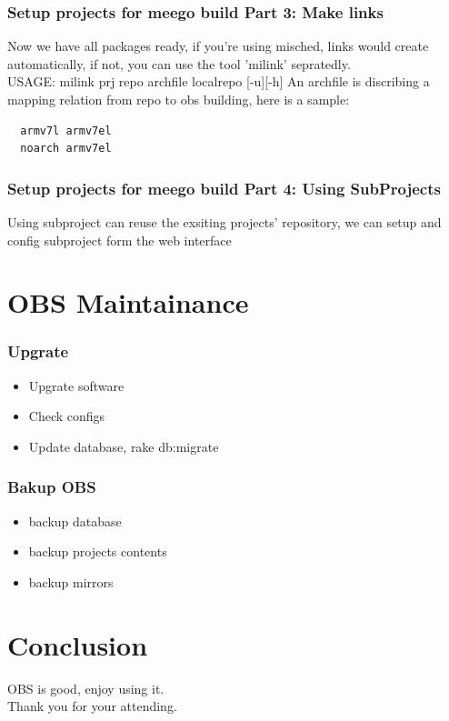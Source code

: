 \documentclass{beamer}
\begin{document}
\begin{frame}[fragile]
  \frametitle{Setup projects for meego build Part 3: Make links}
  Now we have all packages ready, if you're using misched, links would create automatically, if not, you can use the tool 'milink' sepratedly. \\
  USAGE: milink prj repo archfile localrepo [-u][-h]
  An archfile is discribing a mapping relation from repo to obs building, here is a sample: \\

  \lstset{language=perl}
  \begin{lstlisting}
  armv7l armv7el
  noarch armv7el
  \end{lstlisting}
\end{frame}

\begin{frame}
  \frametitle{Setup projects for meego build Part 4: Using SubProjects}
  Using subproject can reuse the exsiting projects' repository, we can setup and config subproject form the web interface\\
\end{frame}

\section{OBS Maintainance}

\begin{frame}
  \frametitle{Upgrate}
  \begin{itemize}
    \item Upgrate software
    \item Check configs
    \item Update database, rake db:migrate
  \end{itemize}
  
\end{frame}
\begin{frame}
  \frametitle{Bakup OBS}
  \begin{itemize}
    \item backup database
    \item backup projects contents
    \item backup mirrors
  \end{itemize}
\end{frame}

\section{Conclusion}
\begin{frame}
  OBS is good, enjoy using it. \\
  Thank you for your attending.
\end{frame}
\end{document}
